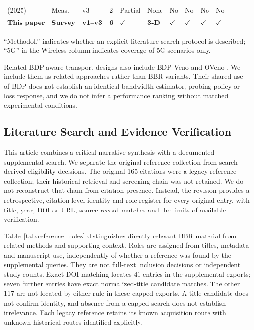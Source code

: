 \documentclass[a4paper,fleqn]{cas-sc}
\begin{document}
\begin{table}[pos=tbp]
\begin{tabularx}{\tblwidth}{@{}p{3.2cm}p{1.4cm}p{1.1cm}p{0.9cm}p{1.0cm}p{1.2cm}p{0.55cm}p{0.55cm}p{0.9cm}p{1.1cm}@{}}
    \citet{bless2025insights} (2025) & Meas. & v3 & 2 & Partial & None & No & No & No & No \\
    \textbf{This paper} & \textbf{Survey} & \textbf{v1--v3} & \textbf{6}
      & $\checkmark$ & \textbf{3-D} & $\checkmark$ & $\checkmark$ & $\checkmark$ & $\checkmark$ \\
    \bottomrule
  \end{tabularx}
  \begin{tablenotes}
    \small
    \item ``Methodol.'' indicates whether an explicit literature search protocol is described;
    ``5G'' in the Wireless column indicates coverage of 5G scenarios only.
  \end{tablenotes}
\end{table}


Related BDP-aware transport designs also include BDP-Veno and OVeno
\citep{biswal2024bdpveno,biswal2025oveno}. We include them as related
approaches rather than BBR variants. Their shared use of BDP does not
establish an identical bandwidth estimator, probing policy or loss
response, and we do not infer a performance ranking without matched
experimental conditions.

\subsection{Literature Search and Evidence Verification}
\label{sec:method}

This article combines a critical narrative synthesis with a documented
supplemental search. We separate the original reference collection from
search-derived eligibility decisions. The original 165 citations were a
legacy reference collection; their historical retrieval and screening chain
was not retained. We do not reconstruct that chain from citation presence.
Instead, the revision provides a retrospective, citation-level identity and
role register for every original entry, with title, year, DOI or URL,
source-record matches and the limits of available verification.

Table~\ref{tab:reference_roles} distinguishes directly relevant BBR material
from related methods and supporting context. Roles are assigned from titles,
metadata and manuscript use, independently of whether a reference was found
by the supplemental queries. They are not full-text inclusion decisions or
independent study counts. Exact DOI matching locates 41 entries in the
supplemental exports; seven further entries have exact normalized-title
candidate matches. The other 117 are not located by either rule in these
capped exports. A title candidate does not confirm identity, and absence
from a capped search does not establish irrelevance. Each legacy reference
retains its known acquisition route with unknown historical routes identified explicitly.
\end{document}
